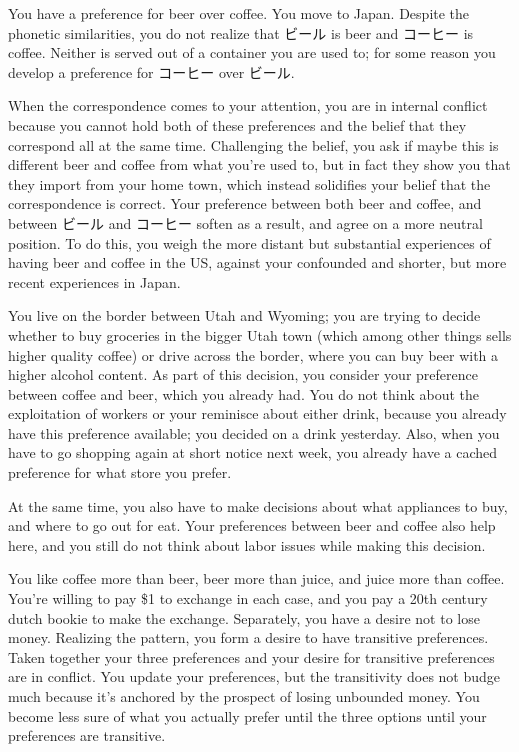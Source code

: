 \documentclass{article}
\begin{document}
	\begin{example}
		You have a preference for beer over coffee. You move to Japan. Despite the phonetic similarities, you do not realize that ビール is beer and コーヒー is coffee. Neither is served out of a container you are used to; for some reason you develop a preference for コーヒー over ビール. 
		
		When the correspondence comes to your attention, you are in internal conflict because you cannot hold both of these preferences and the belief that they correspond all at the same time. Challenging the belief, you ask if maybe this is different beer and coffee from what you're used to, but in fact they show you that they import from your home town, which instead solidifies your belief that the correspondence is correct. Your preference between both beer and coffee, and between ビール and コーヒー soften as a result, and agree on a more neutral position. To do this, you weigh the more distant but substantial experiences of having beer and coffee in the US, against your confounded and shorter, but more recent experiences in Japan.
	\end{example}

	\begin{example}
		You live on the border between Utah and Wyoming; you are trying to decide whether to buy groceries in the bigger Utah town (which among other things sells higher quality coffee) or drive across the border, where you can buy beer with a higher alcohol content. As part of this decision, you consider your preference between coffee and beer, which you already had. You do not think about the exploitation of workers or your reminisce about either drink, because you already have this preference available; you decided on a drink yesterday. Also, when you have to go shopping again at short notice next week, you already have a cached preference for what store you prefer. 
		
		At the same time, you also have to make decisions about what appliances to buy, and where to go out for eat. Your preferences between beer and coffee also help here, and you still do not think about labor issues while making this decision.
	\end{example}

	\begin{example}
		You like coffee more than beer, beer more than juice, and juice more than coffee. You're willing to pay \$1 to exchange in each case, and you pay a 20th century dutch bookie to make the exchange. Separately, you have a desire not to lose money. Realizing the pattern, you form a desire to have transitive preferences. Taken together your three preferences and your desire for transitive preferences are in conflict. You update your preferences, but the transitivity does not budge much because it's anchored by the prospect of losing unbounded money. You become less sure of what you actually prefer until the three options until your preferences are transitive.
	\end{example}
\end{document}
